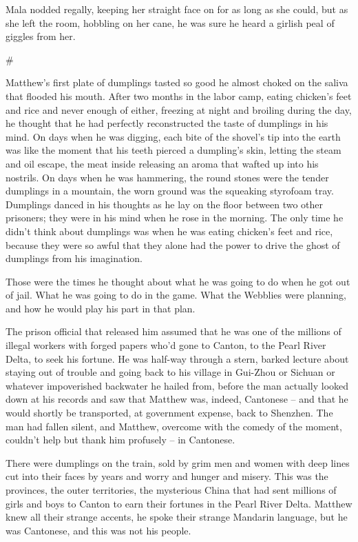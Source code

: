 Mala nodded regally, keeping her straight face on for as long as
she could, but as she left the room, hobbling on her cane, he was
sure he heard a girlish peal of giggles from her.

\#

Matthew's first plate of dumplings tasted so good he almost choked
on the saliva that flooded his mouth. After two months in the labor
camp, eating chicken's feet and rice and never enough of either,
freezing at night and broiling during the day, he thought that he
had perfectly reconstructed the taste of dumplings in his mind. On
days when he was digging, each bite of the shovel's tip into the
earth was like the moment that his teeth pierced a dumpling's skin,
letting the steam and oil escape, the meat inside releasing an
aroma that wafted up into his nostrils. On days when he was
hammering, the round stones were the tender dumplings in a
mountain, the worn ground was the squeaking styrofoam tray.
Dumplings danced in his thoughts as he lay on the floor between two
other prisoners; they were in his mind when he rose in the morning.
The only time he didn't think about dumplings was when he was
eating chicken's feet and rice, because they were so awful that
they alone had the power to drive the ghost of dumplings from his
imagination.

Those were the times he thought about what he was going to do when
he got out of jail. What he was going to do in the game. What the
Webblies were planning, and how he would play his part in that
plan.

The prison official that released him assumed that he was one of
the millions of illegal workers with forged papers who'd gone to
Canton, to the Pearl River Delta, to seek his fortune. He was
half-way through a stern, barked lecture about staying out of
trouble and going back to his village in Gui-Zhou or Sichuan or
whatever impoverished backwater he hailed from, before the man
actually looked down at his records and saw that Matthew was,
indeed, Cantonese -- and that he would shortly be transported, at
government expense, back to Shenzhen. The man had fallen silent,
and Matthew, overcome with the comedy of the moment, couldn't help
but thank him profusely -- in Cantonese.

There were dumplings on the train, sold by grim men and women with
deep lines cut into their faces by years and worry and hunger and
misery. This was the provinces, the outer territories, the
mysterious China that had sent millions of girls and boys to Canton
to earn their fortunes in the Pearl River Delta. Matthew knew all
their strange accents, he spoke their strange Mandarin language,
but he was Cantonese, and this was not his people.

